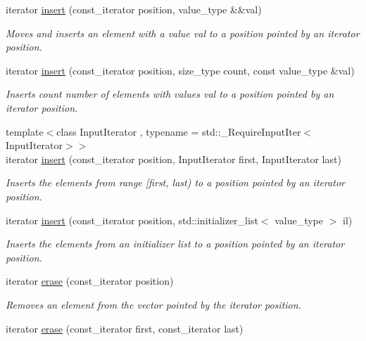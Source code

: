 \begin{DoxyCompactItemize}
iterator \mbox{\hyperlink{classfake_1_1vector_a213241579c0b499ebfbfd139b24f7a60}{insert}} (const\+\_\+iterator position, value\+\_\+type \&\&val)
\begin{DoxyCompactList}\small\item\em Moves and inserts an element with a value val to a position pointed by an iterator position. \end{DoxyCompactList}\item 
iterator \mbox{\hyperlink{classfake_1_1vector_ae0e2fe207c2caffeeb59978b88b1ff3d}{insert}} (const\+\_\+iterator position, size\+\_\+type count, const value\+\_\+type \&val)
\begin{DoxyCompactList}\small\item\em Inserts count number of elements with values val to a position pointed by an iterator position. \end{DoxyCompactList}\item 
{\footnotesize template$<$class Input\+Iterator , typename  = std\+::\+\_\+\+Require\+Input\+Iter$<$\+Input\+Iterator$>$$>$ }\\iterator \mbox{\hyperlink{classfake_1_1vector_ad29ca16087ee045eefbefcebadb50191}{insert}} (const\+\_\+iterator position, Input\+Iterator first, Input\+Iterator last)
\begin{DoxyCompactList}\small\item\em Inserts the elements from range \mbox{[}first, last) to a position pointed by an iterator position. \end{DoxyCompactList}\item 
iterator \mbox{\hyperlink{classfake_1_1vector_aa4507d6807264094b8b033b1cce41313}{insert}} (const\+\_\+iterator position, std\+::initializer\+\_\+list$<$ value\+\_\+type $>$ il)
\begin{DoxyCompactList}\small\item\em Inserts the elements from an initializer list to a position pointed by an iterator position. \end{DoxyCompactList}\item 
iterator \mbox{\hyperlink{classfake_1_1vector_a9f770760191adfcaab0f08dc29689d48}{erase}} (const\+\_\+iterator position)
\begin{DoxyCompactList}\small\item\em Removes an element from the vector pointed by the iterator position. \end{DoxyCompactList}\item 
iterator \mbox{\hyperlink{classfake_1_1vector_a22a4f0fb6b42d2ec7107bb8194f4106c}{erase}} (const\+\_\+iterator first, const\+\_\+iterator last)

\end{DoxyCompactItemize}
